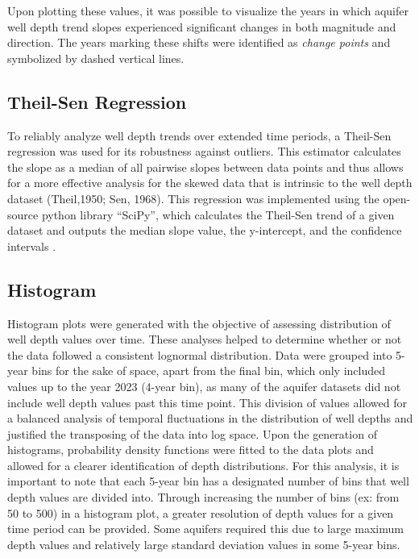 Upon plotting these values, it was possible to visualize the years in which aquifer well depth trend slopes experienced significant changes in both magnitude and direction. The years marking these shifts were identified as \textit{change points} and symbolized by dashed vertical lines.

\subsection*{Theil-Sen Regression}

To reliably analyze well depth trends over extended time periods, a Theil-Sen regression was used for its robustness against outliers. This estimator calculates the slope as a median of all pairwise slopes between data points and thus allows for a more effective analysis for the skewed data that is intrinsic to the well depth dataset (Theil,1950; Sen, 1968). This regression was implemented using the open-source python library “SciPy”, which calculates the Theil-Sen trend of a given dataset and outputs the median slope value, the y-intercept, and the confidence intervals \cite{SciPy2020}.

\subsection*{Histogram}

Histogram plots were generated with the objective of assessing distribution of well depth values over time. These analyses helped to determine whether or not the data followed a consistent lognormal distribution. Data were grouped into 5-year bins for the sake of space, apart from the final bin, which only included values up to the year 2023 (4-year bin), as many of the aquifer datasets did not include well depth values past this time point. This division of values allowed for a balanced analysis of temporal fluctuations in the distribution of well depths and justified the transposing of the data into log space. Upon the generation of histograms, probability density functions were fitted to the data plots and allowed for a clearer identification of depth distributions. For this analysis, it is important to note that each 5-year bin has a designated number of bins that well depth values are divided into. Through increasing the number of bins (ex: from 50 to 500) in a histogram plot, a greater resolution of depth values for a given time period can be provided. Some aquifers required this due to large maximum depth values and relatively large standard deviation values in some 5-year bins.
